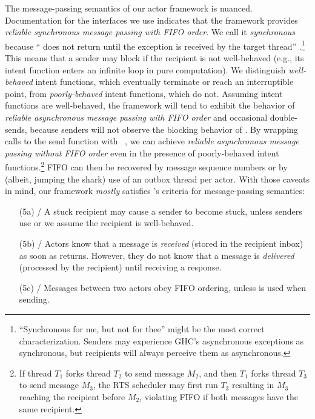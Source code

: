 \documentclass[sigplan,screen]{acmart}
\begin{document}
The message-passing semantics of our actor framework is nuanced.
%
Documentation for the interfaces we use indicates that the framework provides
\emph{reliable synchronous message passing with FIFO order}.
%
We call it \emph{synchronous} because `` does not return until
the exception is received by the target thread''
\cite{controlDotException}.\footnote{
    ``Synchronous for me, but not for thee'' might be the most correct
    characterization. Senders may experience GHC's asynchronous exceptions as
    synchronous, but recipients will always perceive them as asynchronous.
}
%
This means that a sender may block if the recipient is not well-behaved (e.g.,
its intent function enters an infinite loop in pure computation).
%
We distinguish \emph{well-behaved} intent functions, which eventually
terminate or reach an interruptible point,
from \emph{poorly-behaved} intent functions, which do not.
%
Assuming intent functions are well-behaved,
the framework will tend to exhibit the behavior of
\emph{reliable asynchronous message passing with FIFO order}
and occasional double-sends,
because senders will not observe the blocking behavior of .
%
By wrapping calls to the send function with ~\cite{marlow2001async}, we can achieve
\emph{reliable asynchronous message passing without FIFO order}
even in the presence of poorly-behaved intent functions.\footnote{
    If thread $T_1$ forks thread $T_2$ to send message $M_2$, and then $T_1$
    forks thread $T_3$ to send message $M_3$, the RTS scheduler may first run
    $T_3$ resulting in $M_3$ reaching the recipient before $M_2$, violating
    FIFO if both messages have the same recipient.
}
%
FIFO can then be recovered by message sequence numbers or by (albeit, jumping the
shark) use of an outbox thread per actor.
%
With those caveats in mind, our framework \emph{mostly} satisfies \citet{armstrong2003}'s criteria for message-passing semantics:
%
%
\begin{enumerate}[leftmargin=2em]
    \item[(5a)] / A stuck recipient may cause a sender to become stuck,
    unless senders use 
    or we assume the recipient is well-behaved.

    \item[(5b)] / Actors know that a message is \emph{received} (stored
    in the recipient inbox) as soon as  returns.
    However, they do not know that a message is \emph{delivered} (processed by
    the recipient) until receiving a response.

    \item[(5c)] / Messages between two actors obey FIFO ordering,
    unless  is used when sending.
\end{enumerate}
\end{document}
